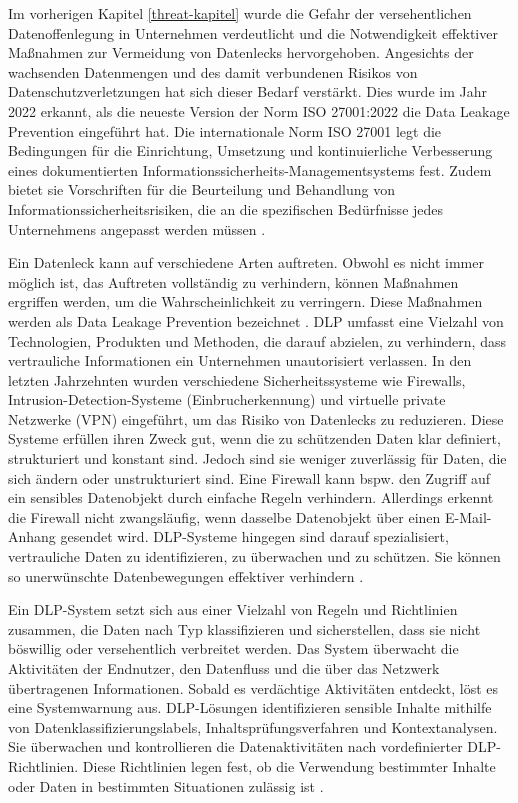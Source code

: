 Im vorherigen Kapitel \ref{threat-kapitel} wurde die Gefahr der versehentlichen Datenoffenlegung in Unternehmen verdeutlicht und die Notwendigkeit effektiver Maßnahmen zur Vermeidung von Datenlecks hervorgehoben. Angesichts der wachsenden Datenmengen und des damit verbundenen Risikos von Datenschutzverletzungen hat sich dieser Bedarf verstärkt. Dies wurde im Jahr 2022 erkannt, als die neueste Version der Norm ISO 27001:2022 die Data Leakage Prevention eingeführt hat. Die internationale Norm ISO 27001 legt die Bedingungen für die Einrichtung, Umsetzung und kontinuierliche Verbesserung eines dokumentierten Informationssicherheits-Managementsystems fest. Zudem bietet sie Vorschriften für die Beurteilung und Behandlung von Informationssicherheitsrisiken, die an die spezifischen Bedürfnisse jedes Unternehmens angepasst werden müssen \cite{Monev.2023}.

Ein Datenleck kann auf verschiedene Arten auftreten. Obwohl es nicht immer möglich ist, das Auftreten vollständig zu verhindern, können Maßnahmen ergriffen werden, um die Wahrscheinlichkeit zu verringern. Diese Maßnahmen werden als Data Leakage Prevention bezeichnet \cite{Monev.2023}. DLP umfasst eine Vielzahl von Technologien, Produkten und Methoden, die darauf abzielen, zu verhindern, dass vertrauliche Informationen ein Unternehmen unautorisiert verlassen. In den letzten Jahrzehnten wurden verschiedene Sicherheitssysteme wie Firewalls, Intrusion-Detection-Systeme (Einbrucherkennung) und virtuelle private Netzwerke (VPN) eingeführt, um das Risiko von Datenlecks zu reduzieren. Diese Systeme erfüllen ihren Zweck gut, wenn die zu schützenden Daten klar definiert, strukturiert und konstant sind. Jedoch sind sie weniger zuverlässig für Daten, die sich ändern oder unstrukturiert sind.  Eine Firewall kann bspw. den Zugriff auf ein sensibles Datenobjekt durch einfache Regeln verhindern. Allerdings erkennt die Firewall nicht zwangsläufig, wenn dasselbe Datenobjekt über einen E-Mail-Anhang gesendet wird. DLP-Systeme hingegen sind darauf spezialisiert, vertrauliche Daten zu identifizieren, zu überwachen und zu schützen. Sie können so unerwünschte Datenbewegungen effektiver verhindern \cite{Alneyadi.2016}.

Ein DLP-System setzt sich aus einer Vielzahl von Regeln und Richtlinien zusammen, die Daten nach Typ klassifizieren und sicherstellen, dass sie nicht böswillig oder versehentlich verbreitet werden. Das System überwacht die Aktivitäten der Endnutzer, den Datenfluss und die über das Netzwerk übertragenen Informationen. Sobald es verdächtige Aktivitäten entdeckt, löst es eine Systemwarnung aus. DLP-Lösungen identifizieren sensible Inhalte mithilfe von Datenklassifizierungslabels, Inhaltsprüfungsverfahren und Kontextanalysen. Sie überwachen und kontrollieren die Datenaktivitäten nach vordefinierter DLP-Richtlinien. Diese Richtlinien legen fest, ob die Verwendung bestimmter Inhalte oder Daten in bestimmten Situationen zulässig ist \cite{Chugh.2023}.

